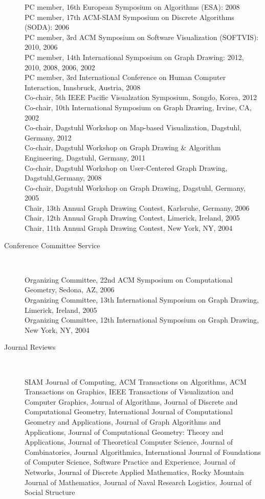 \documentclass[10pt]{article}
\begin{document}
\begin{description}
PC member, 16th European Symposium on Algorithms (ESA): 2008\\
PC member, 17th ACM-SIAM Symposium on Discrete Algorithms (SODA): 2006\\
PC member, 3rd ACM Symposium on Software Visualization (SOFTVIS):  2010, 2006\\
PC member, 14th International Symposium on Graph Drawing: 2012, 2010, 2008, 2006, 2002\\
PC member, 3rd International Conference on Human Computer Interaction,
Innsbruck, Austria, 2008\\
Co-chair, 5th IEEE Pacific Visualzation Symposium, Songdo, Korea, 2012\\
Co-chair, 10th International Symposium on Graph Drawing, Irvine, CA, 2002\\
Co-chair, Dagstuhl Workshop on Map-based Visualization, Dagstuhl, Germany, 2012\\
Co-chair, Dagstuhl Workshop on Graph Drawing \& Algorithm Engineering, Dagstuhl, Germany, 2011\\
Co-chair, Dagstuhl Workshop on User-Centered Graph Drawing, Dagstuhl,Germany, 2008\\
Co-chair, Dagstuhl Workshop on Graph Drawing, Dagstuhl, Germany, 2005\\
Chair, 13th Annual Graph Drawing Contest, Karlsruhe, Germany, 2006\\
Chair, 12th Annual Graph Drawing Contest, Limerick, Ireland, 2005\\
Chair, 11th Annual Graph Drawing Contest, New York, NY, 2004\\

\vspace{-.4cm}\item [Conference Committee Service]\

Organizing Committee, 22nd ACM Symposium on Computational Geometry, Sedona, AZ, 2006\\
Organizing Committee, 13th International Symposium on Graph Drawing, Limerick, Ireland, 2005\\
Organizing Committee, 12th International Symposium on Graph Drawing, New York, NY, 2004\\



\vspace{-.4cm}\item [Journal Reviews]\

SIAM Journal of Computing, ACM Transactions on Algorithms, ACM Transactions on Graphics, IEEE Transactions of Visualization and Computer Graphics, Journal of Algorithms, Journal of Discrete and Computational Geometry, International Journal of Computational Geometry and Applications, Journal of Graph Algorithms and Applications, Journal of Computational Geometry: Theory and Applications, Journal of Theoretical Computer Science, Journal of Combinatorics, Journal Algorithmica, International Journal of Foundations of Computer Science, Software Practice and Experience, Journal of Networks, Journal of Discrete Applied Mathematics, Rocky Mountain Journal of Mathematics, Journal of Naval Research Logistics, Journal of Social Structure\\


\end{description}
\end{document}
